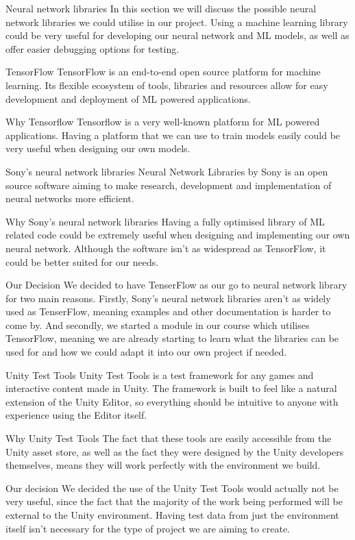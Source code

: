 Neural network libraries
In this section we will discuss the possible neural network libraries we could utilise in our project. Using a machine learning library could be very useful for developing our neural network and ML models, as well as offer easier debugging options for testing.

TensorFlow
TensorFlow is an end-to-end open source platform for machine learning. Its flexible ecosystem of tools, libraries and resources allow for easy development and deployment of ML powered applications.

Why Tensorflow
Tensorflow is a very well-known platform for ML powered applications. Having a platform that we can use to train models easily could be very useful when designing our own models.

Sony’s neural network libraries
Neural Network Libraries by Sony is an open source software aiming to make research, development and implementation of neural networks more efficient.

Why Sony’s neural network libraries
Having a fully optimised library of ML related code could be extremely useful when designing and implementing our own neural network. Although the software isn’t as widespread as TensorFlow, it could be better suited for our needs.

Our Decision
We decided to have TenserFlow as our go to neural network library for two main reasons. Firstly, Sony’s neural network libraries aren’t as widely used as TenserFlow, meaning examples and other documentation is harder to come by. And secondly, we started a module in our course which utilises TensorFlow, meaning we are already starting to learn what the libraries can be used for and how we could adapt it into our own project if needed.

Unity Test Tools 
Unity Test Tools is a test framework for any games and interactive content made in Unity. The framework is built to feel like a natural extension of the Unity Editor, so everything should be intuitive to anyone with experience using the Editor itself.


Why Unity Test Tools
The fact that these tools are easily accessible from the Unity asset store, as well as the fact they were designed by the Unity developers themselves, means they will work perfectly with the environment we build.

Our decision
We decided the use of the Unity Test Tools would actually not be very useful, since the fact that the majority of the work being performed will be external to the Unity environment. Having test data from just the environment itself isn’t necessary for the type of project we are aiming to create.





